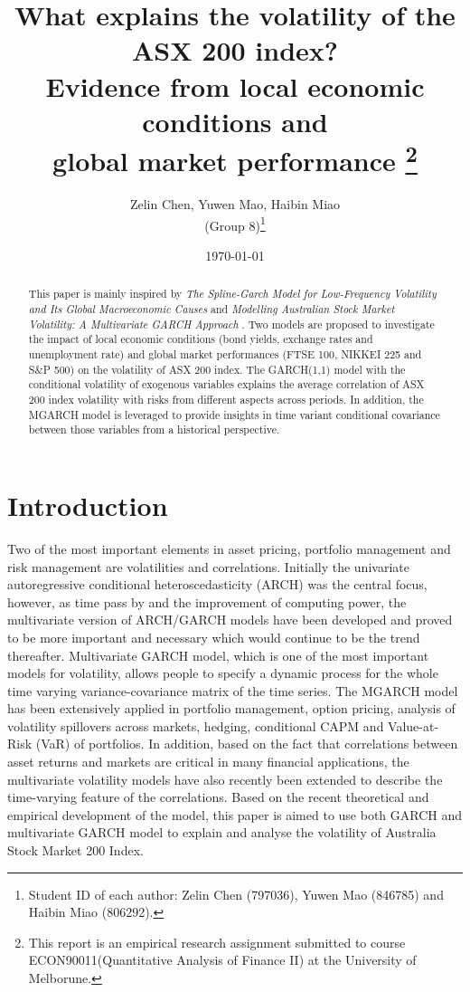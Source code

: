 \documentclass[11pt]{article}
\title{What explains the volatility of the ASX 200 index? \\ Evidence from local economic conditions and \\global market performance \footnote{This report is an empirical research assignment submitted to course ECON90011(Quantitative Analysis of Finance II) at the University of Melborune.}}
\author{Zelin Chen, Yuwen Mao, Haibin Miao\\
		(Group 8)\footnote{Student ID of each author: Zelin Chen (797036), Yuwen Mao (846785) and Haibin Miao (806292). }}
\date{\today}
\begin{document}
 
	\maketitle
\begin{abstract}
This paper is mainly inspired by \emph{The Spline-Garch Model for Low-Frequency Volatility and Its Global Macroeconomic Causes} \citep{Spline} and \emph{Modelling Australian Stock Market Volatility: A Multivariate GARCH Approach} \citep{index}. Two models are proposed to investigate the impact of local economic conditions (bond yields, exchange rates and unemployment rate) and global market performances (FTSE 100, NIKKEI 225 and S\&P 500) on the volatility of ASX 200 index. The GARCH(1,1) model with the conditional volatility of exogenous variables explains the average correlation of ASX 200 index volatility with risks from different aspects across periods. In addition, the MGARCH model is leveraged to provide insights in time variant conditional covariance between those variables from a historical perspective. 
\end{abstract}
\newpage

\section{Introduction}
Two of the most important elements in asset pricing, portfolio management and risk management are volatilities and correlations. Initially the univariate autoregressive conditional heteroscedasticity (ARCH) was the central focus, however, as time pass by and the improvement of computing power, the multivariate version of ARCH/GARCH models have been developed and proved to be more important and necessary which would continue to be the trend thereafter. Multivariate GARCH model, which is one of the most important models for volatility, allows people to specify a dynamic process for the whole time varying variance-covariance matrix of the time series. The MGARCH model has been extensively applied in portfolio management, option pricing, analysis of volatility spillovers across markets, hedging, conditional CAPM and Value-at-Risk (VaR) of portfolios. In addition, based on the fact that correlations between asset returns and markets are critical in many financial applications, the multivariate volatility models have also recently been extended to describe the time-varying feature of the correlations. Based on the recent theoretical and empirical development of the model, this paper is aimed to use both GARCH and multivariate GARCH model to explain and analyse the volatility of Australia Stock Market 200 Index.
\end{document}
